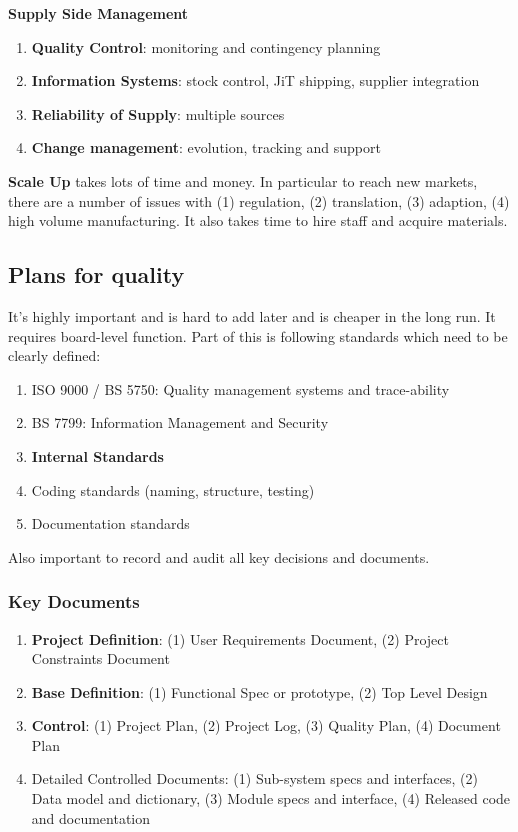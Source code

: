 \documentclass{article}
\begin{document}
\begin{multicols}{2}
\textbf{Supply Side Management}
\begin{enumerate}
    \item \textbf{Quality Control}: monitoring and contingency planning
    \item \textbf{Information Systems}: stock control, JiT shipping, supplier integration
    \item \textbf{Reliability of Supply}: multiple sources
    \item \textbf{Change management}: evolution, tracking and support
\end{enumerate}

\textbf{Scale Up} takes lots of time and money. In particular to reach new markets, there are a number of issues with (1) regulation, (2) translation, (3) adaption, (4) high volume manufacturing. It also takes time to hire staff and acquire materials.

\subsection{Plans for quality}
It's highly important and is hard to add later and is cheaper in the long run. It requires board-level function. Part of this is following standards which need to be clearly defined:
\begin{enumerate}
    \item ISO 9000 / BS 5750: Quality management systems and trace-ability
    \item BS 7799: Information Management and Security
    \item \textbf{Internal Standards}
    \item Coding standards (naming, structure, testing)
    \item Documentation standards
\end{enumerate}

Also important to record and audit all key decisions and documents.

\subsubsection{Key Documents}
\begin{enumerate}
    \item \textbf{Project Definition}: (1) User Requirements Document, (2) Project Constraints Document
    \item \textbf{Base Definition}: (1) Functional Spec or prototype, (2) Top Level Design
    \item \textbf{Control}: (1) Project Plan, (2) Project Log, (3) Quality Plan, (4) Document Plan
    \item Detailed Controlled Documents: (1) Sub-system specs and interfaces, (2) Data model and dictionary, (3) Module specs and interface, (4) Released code and documentation
\end{enumerate}


\end{multicols}
\end{document}
